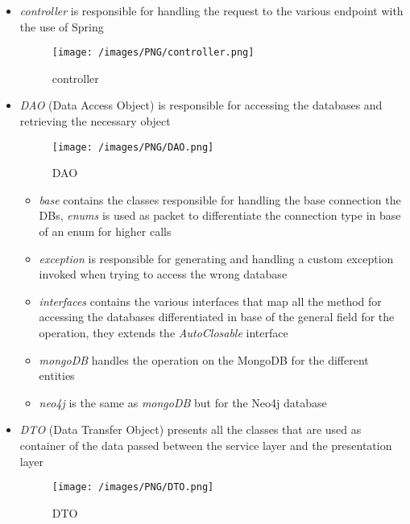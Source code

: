 \begin{itemize}
	\item \emph{controller} is responsible for handling the request to the various endpoint with the use of Spring
	\begin{figure}[H]
	\begin{center}
	\texttt{[image: /images/PNG/controller.png]}
	\caption{controller}
	\end{center}
	\end{figure}
	
	\item \emph{DAO} (Data Access Object) is responsible for accessing the databases and retrieving the necessary object
	\begin{figure}[H]
	\begin{center}
	\texttt{[image: /images/PNG/DAO.png]}
	\caption{DAO}
	\end{center}
	\end{figure}
	\begin{itemize}
		\item \emph{base} contains the classes responsible for handling the base connection the DBs, \emph{enums} is used as packet to differentiate the connection type in base of an enum for higher calls
	
		\item \emph{exception} is responsible for generating and handling a custom exception invoked when trying to access the wrong database
	
		\item \emph{interfaces} contains the various interfaces that map all the method for accessing the databases differentiated in base of the general field for the operation, they extends the \emph{AutoClosable} interface
		\item \emph{mongoDB} handles the operation on the MongoDB for the different entities
		\item \emph{neo4j} is the same as \emph{mongoDB} but for the Neo4j database
	
	\end{itemize}
	\item \emph{DTO} (Data Transfer Object) presents all the classes that are used as container of the data passed between the service layer and the presentation layer
	
	\begin{figure}[H]
	\begin{center}
	\texttt{[image: /images/PNG/DTO.png]}
	\caption{DTO}
	\end{center}
	\end{figure}
	
\end{itemize}
